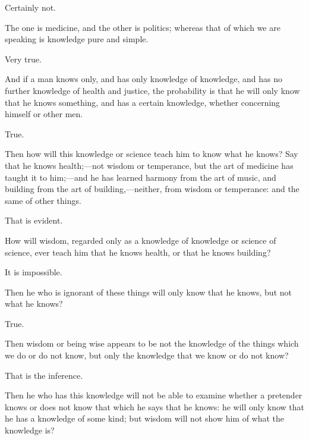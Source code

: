 \documentclass[11pt,letter]{article}
\begin{document}
\par  Certainly not.

\par  The one is medicine, and the other is politics; whereas that of which we are speaking is knowledge pure and simple.

\par  Very true.

\par  And if a man knows only, and has only knowledge of knowledge, and has no further knowledge of health and justice, the probability is that he will only know that he knows something, and has a certain knowledge, whether concerning himself or other men.

\par  True.

\par  Then how will this knowledge or science teach him to know what he knows? Say that he knows health;—not wisdom or temperance, but the art of medicine has taught it to him;—and he has learned harmony from the art of music, and building from the art of building,—neither, from wisdom or temperance: and the same of other things.

\par  That is evident.

\par  How will wisdom, regarded only as a knowledge of knowledge or science of science, ever teach him that he knows health, or that he knows building?

\par  It is impossible.

\par  Then he who is ignorant of these things will only know that he knows, but not what he knows?

\par  True.

\par  Then wisdom or being wise appears to be not the knowledge of the things which we do or do not know, but only the knowledge that we know or do not know?

\par  That is the inference.

\par  Then he who has this knowledge will not be able to examine whether a pretender knows or does not know that which he says that he knows: he will only know that he has a knowledge of some kind; but wisdom will not show him of what the knowledge is?
\end{document}
